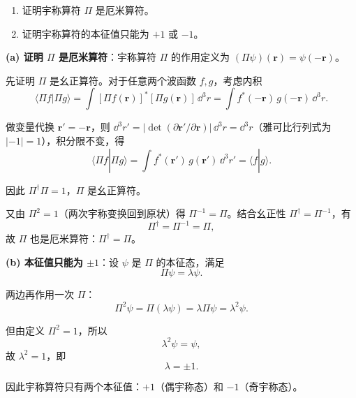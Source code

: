 \begin{question}
\begin{enumerate}
\item 证明宇称算符 $\Pi$ 是厄米算符。
\item 证明宇称算符的本征值只能为 $+1$ 或 $-1$。
\end{enumerate}
\end{question}
\begin{solution}
	\textbf{(a) 证明 $\Pi$ 是厄米算符}：宇称算符 $\Pi$ 的作用定义为 $(\Pi\psi)(\mathbf r)=\psi(-\mathbf r)$。

	先证明 $\Pi$ 是幺正算符。对于任意两个波函数 $f,g$，考虑内积
	\[
	\langle \Pi f|\Pi g\rangle=\int [\Pi f(\mathbf r)]^* [\Pi g(\mathbf r)]\,\dd^3 r
	=\int f^*(-\mathbf r)\,g(-\mathbf r)\,\dd^3 r.
	\]

	做变量代换 $\mathbf r'=-\mathbf r$，则 $\dd^3 r' = |\det(\partial\mathbf r'/\partial\mathbf r)|\,\dd^3 r = \dd^3 r$（雅可比行列式为 $|-1|=1$），积分限不变，得
	\[
	\langle \Pi f|\Pi g\rangle = \int f^*(\mathbf r')\,g(\mathbf r')\,\dd^3 r' = \langle f|g\rangle.
	\]

	因此 $\Pi^\dagger\Pi = 1$，$\Pi$ 是幺正算符。

	又由 $\Pi^2=1$（两次宇称变换回到原状）得 $\Pi^{-1}=\Pi$。结合幺正性 $\Pi^\dagger=\Pi^{-1}$，有
	\[
	\Pi^\dagger = \Pi^{-1} = \Pi,
	\]
	故 $\Pi$ 也是厄米算符：$\boxed{\Pi^\dagger = \Pi}$。

	\textbf{(b) 本征值只能为 $\pm1$}：设 $\psi$ 是 $\Pi$ 的本征态，满足
	\[
	\Pi\psi = \lambda\psi.
	\]

	两边再作用一次 $\Pi$：
	\[
	\Pi^2\psi = \Pi(\lambda\psi) = \lambda\Pi\psi = \lambda^2\psi.
	\]

	但由定义 $\Pi^2=1$，所以
	\[
	\lambda^2\psi = \psi,
	\]
	故 $\lambda^2=1$，即
	\[
	\boxed{\lambda = \pm 1}.
	\]

	因此宇称算符只有两个本征值：$+1$（偶宇称态）和 $-1$（奇宇称态）。
	\end{solution}


